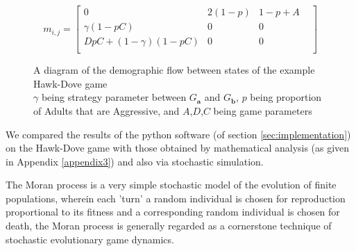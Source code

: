 \begin{equation}\label{eq:hd_transmission} m_{i,j} = \begin{bmatrix}
    0 & 2(1-p) & 1-p+A & \\
    \gamma(1-pC) & 0 & 0  & \\
     DpC+(1-\gamma)(1-pC)  & 0 & 0  & \\
\end{bmatrix} \end{equation}
\begin{figure}[]
\begin{center}
\end{center}
\caption{A diagram of the demographic flow between states of the example Hawk-Dove game\\$\gamma$ being strategy parameter between $G_\mathbf{a}$ and $G_\mathbf{b}$, $p$ being proportion of Adults that are Aggressive, and $A$,$D$,$C$ being game parameters}
\label{fig:flow}
\end{figure}

We compared the results of the python software (of section \ref{sec:implementation}) on the Hawk-Dove game with those obtained by mathematical analysis (as given in Appendix \ref{appendix3}) and also via stochastic simulation.

The Moran process is a very simple stochastic model of the evolution of finite populations, wherein each 'turn' a random individual is chosen for reproduction proportional to its fitness and a corresponding random individual is chosen for death, the Moran process is generally regarded as a cornerstone technique of stochastic evolutionary game dynamics.\cite{stochastic1}


